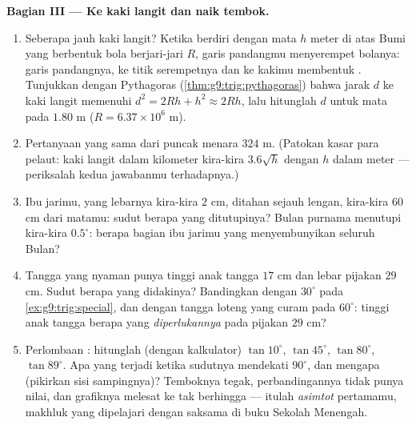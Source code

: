 \begin{problem}
\medskip
\noindent\textbf{Bagian III --- Ke kaki langit dan naik tembok.}
\begin{enumerate}[resume]
  \item Seberapa jauh kaki langit? Ketika berdiri dengan mata $h$
        meter di atas Bumi yang berbentuk bola berjari-jari $R$,
        garis pandangmu menyerempet bolanya: garis pandangnya,
         ke titik serempetnya dan  ke kakimu
        membentuk . Tunjukkan dengan Pythagoras
        (\cref{thm:g9:trig:pythagoras}) bahwa jarak $d$ ke
        kaki langit memenuhi $d^2 = 2Rh + h^2 \approx 2Rh$,
        lalu hitunglah $d$ untuk mata pada $1.80$ m
        ($R = 6.37 \times 10^6$ m).
  \item Pertanyaan yang sama dari puncak menara $324$ m. (Patokan
        kasar para pelaut: kaki langit dalam kilometer kira-kira
        $3.6\sqrt{h}$ dengan $h$ dalam meter --- periksalah kedua
        jawabanmu terhadapnya.)
  \item Ibu jarimu, yang lebarnya kira-kira $2$ cm, ditahan sejauh
        lengan, kira-kira $60$ cm dari matamu: sudut berapa yang
        ditutupinya? Bulan purnama menutupi kira-kira $0.5^\circ$:
        berapa bagian ibu jarimu yang menyembunyikan seluruh Bulan?
  \item Tangga yang nyaman punya tinggi anak tangga $17$ cm dan
        lebar pijakan $29$ cm. Sudut berapa yang didakinya?
        Bandingkan dengan $30^\circ$ pada \cref{ex:g9:trig:special},
        dan dengan tangga loteng yang curam pada $60^\circ$: tinggi
        anak tangga berapa yang \emph{diperlukannya} pada pijakan
        $29$ cm?
  \item Perlombaan : hitunglah (dengan kalkulator)
        $\tan 10^\circ$, $\tan 45^\circ$, $\tan 80^\circ$,
        $\tan 89^\circ$. Apa yang terjadi ketika sudutnya mendekati
        $90^\circ$, dan mengapa (pikirkan sisi sampingnya)? Temboknya
        tegak, perbandingannya tidak punya nilai, dan grafiknya
        melesat ke tak berhingga --- itulah \emph{asimtot} pertamamu,
        makhluk yang dipelajari dengan saksama di buku Sekolah
        Menengah.

\end{enumerate}
\end{problem}
